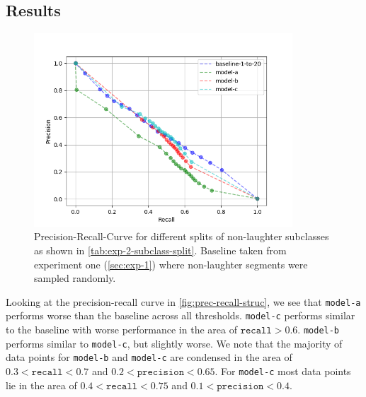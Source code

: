 \documentclass[bsc,frontabs,parskip,deptreport]{infthesis}
\begin{document}
\subsection{Results}
\begin{figure}[h!]
    \centering
    \includegraphics[width = 3.8in]{imgs/prec-recall/exp2-structured/dev_compare_class_balance_dev_set.png}
    \caption{Precision-Recall-Curve for different splits of non-laughter subclasses as shown in \autoref{tab:exp-2-subclass-split}. Baseline taken from experiment one (\autoref{sec:exp-1}) where non-laughter segments were sampled randomly.}
    \label{fig:prec-recall-struc}
\end{figure}




Looking at the precision-recall curve in \autoref{fig:prec-recall-struc}, we see that \texttt{model-a} performs worse than the baseline across all thresholds. \texttt{model-c} performs similar to the baseline with worse performance in the area of $\mathtt{recall} > 0.6$. \texttt{model-b} performs similar to \texttt{model-c}, but slightly worse.
We note that the majority of data points for \texttt{model-b} and \texttt{model-c} are condensed in the area of $0.3 < \mathtt{recall} < 0.7$ and $0.2 < \mathtt{precision} < 0.65$. For \texttt{model-c} most data points lie in the area of $0.4 < \mathtt{recall} < 0.75$ and $0.1 < \mathtt{precision} < 0.4$.
\end{document}
